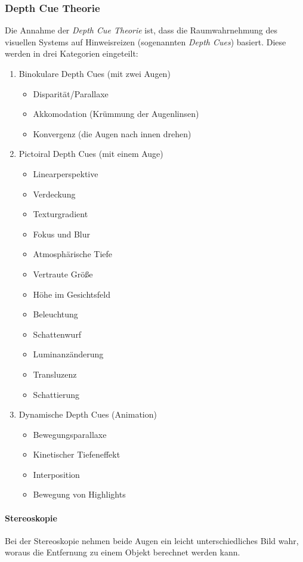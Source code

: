 \documentclass[a4paper, 11pt, accentcolor = tud3b]{tudreport}
\begin{document}
				\subsubsection{Depth Cue Theorie}
					Die Annahme der \emph{Depth Cue Theorie} ist, dass die Raumwahrnehmung des visuellen Systems auf Hinweisreizen (sogenannten \emph{Depth Cues}) basiert. Diese werden in drei Kategorien eingeteilt:
					\begin{enumerate}
						\item Binokulare Depth Cues (mit zwei Augen)
							\begin{itemize}
								\item Disparität/Parallaxe
								\item Akkomodation (Krümmung der Augenlinsen)
								\item Konvergenz (die Augen nach innen drehen)
							\end{itemize}
						\item Pictoiral Depth Cues (mit einem Auge)
							\begin{itemize}
								\item Linearperspektive
								\item Verdeckung
								\item Texturgradient
								\item Fokus und Blur
								\item Atmosphärische Tiefe
								\item Vertraute Größe
								\item Höhe im Gesichtsfeld
								\item Beleuchtung
								\item Schattenwurf
								\item Luminanzänderung
								\item Transluzenz
								\item Schattierung
							\end{itemize}
						\item Dynamische Depth Cues (Animation)
							\begin{itemize}
								\item Bewegungsparallaxe
								\item Kinetischer Tiefeneffekt
								\item Interposition
								\item Bewegung von Highlights
							\end{itemize}
					\end{enumerate}

					\paragraph{Stereoskopie}
						Bei der Stereoskopie nehmen beide Augen ein leicht unterschiedliches Bild wahr, woraus die Entfernung zu einem Objekt berechnet werden kann.
\end{document}
